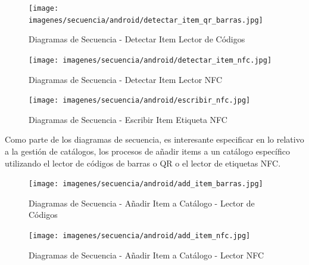 \documentclass[a4paper,11pt]{book}
\begin{document}
\begin{figure}[H] 
\centering 
\texttt{[image: imagenes/secuencia/android/detectar\_item\_qr\_barras.jpg]}
\caption{ Diagramas de Secuencia - Detectar Item Lector de Códigos\cite{diagrama}  }  
\end{figure}

\begin{figure}[H] 
\centering 
\texttt{[image: imagenes/secuencia/android/detectar\_item\_nfc.jpg]}
\caption{ Diagramas de Secuencia - Detectar Item Lector NFC\cite{diagrama}  }  
\end{figure}

\begin{figure}[H] 
\centering 
\texttt{[image: imagenes/secuencia/android/escribir\_nfc.jpg]}
\caption{ Diagramas de Secuencia - Escribir Item Etiqueta NFC\cite{diagrama}  }  
\end{figure}

Como parte de los diagramas de secuencia, es interesante especificar en lo relativo a la gestión de catálogos, los procesos de añadir items a un catálogo específico utilizando el lector de códigos de barras o QR o el lector de etiquetas NFC.

\begin{figure}[H] 
\centering 
\texttt{[image: imagenes/secuencia/android/add\_item\_barras.jpg]}
\caption{ Diagramas de Secuencia - Añadir Item a Catálogo - Lector de Códigos\cite{diagrama}  }  
\end{figure}

\begin{figure}[H] 
\centering 
\texttt{[image: imagenes/secuencia/android/add\_item\_nfc.jpg]}
\caption{ Diagramas de Secuencia - Añadir Item a Catálogo - Lector NFC\cite{diagrama}  }  
\end{figure}
\end{document}
